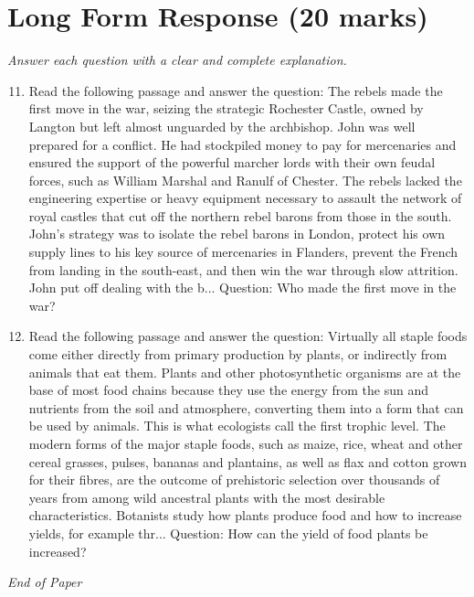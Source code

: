 \documentclass[12pt]{article}
\begin{document}
\section*{Long Form Response (20 marks)}
\textit{Answer each question with a clear and complete explanation.}
\begin{enumerate}[label=\arabic*.]
\setcounter{enumi}{10}
\item Read the following passage and answer the question: The rebels made the first move in the war, seizing the strategic Rochester Castle, owned by Langton but left almost unguarded by the archbishop. John was well prepared for a conflict. He had stockpiled money to pay for mercenaries and ensured the support of the powerful marcher lords with their own feudal forces, such as William Marshal and Ranulf of Chester. The rebels lacked the engineering expertise or heavy equipment necessary to assault the network of royal castles that cut off the northern rebel barons from those in the south. John's strategy was to isolate the rebel barons in London, protect his own supply lines to his key source of mercenaries in Flanders, prevent the French from landing in the south-east, and then win the war through slow attrition. John put off dealing with the b... Question: Who made the first move in the war?
\item Read the following passage and answer the question: Virtually all staple foods come either directly from primary production by plants, or indirectly from animals that eat them. Plants and other photosynthetic organisms are at the base of most food chains because they use the energy from the sun and nutrients from the soil and atmosphere, converting them into a form that can be used by animals. This is what ecologists call the first trophic level. The modern forms of the major staple foods, such as maize, rice, wheat and other cereal grasses, pulses, bananas and plantains, as well as flax and cotton grown for their fibres, are the outcome of prehistoric selection over thousands of years from among wild ancestral plants with the most desirable characteristics. Botanists study how plants produce food and how to increase yields, for example thr... Question: How can the yield of food plants be increased?
\end{enumerate}

\vfill
\noindent\textit{End of Paper}
\end{document}
